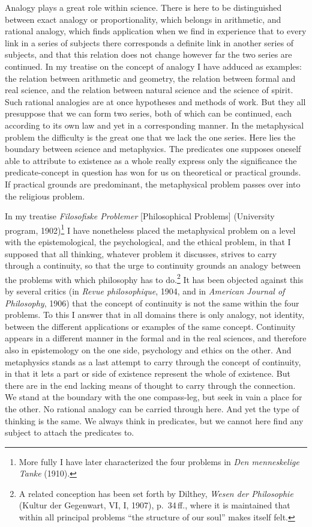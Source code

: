 \documentclass[12pt]{book}
\newcommand{\opage}[1]{\marginnote{\footnotesize\textit{[#1]}}}
\begin{document}
Analogy plays a great role within science. There is here to be distinguished between exact analogy or
proportionality, which belongs in arithmetic, and rational analogy, which finds application when we find in
experience that to every link in a series of subjects there corresponds a definite link in another series
of subjects, and that this relation does not change however far the two series are continued. In my treatise
on the concept of analogy I have adduced as examples: the relation between arithmetic and geometry, the
relation between formal and real science, and \opage{84}the relation between natural science and the science of
spirit. Such rational analogies are at once hypotheses and methods of work. But they all presuppose that we
can form two series, both of which can be continued, each according to its own law and yet in a
corresponding manner. In the metaphysical problem the difficulty is the great one that we lack the one
series. Here lies the boundary between science and metaphysics. The predicates one supposes oneself able to
attribute to existence as a whole really express only the significance the predicate-concept in question has
won for us on theoretical or practical grounds. If practical grounds are predominant, the metaphysical
problem passes over into the religious problem.

In my treatise \textit{Filosofiske Problemer} [Philosophical Problems] (University program,
1902)\footnote{More fully I have later characterized the four problems in \textit{Den menneskelige Tanke}
(1910).} I have nonetheless placed the metaphysical problem on a level with the epistemological, the
psychological, and the ethical problem, in that I supposed that all thinking, whatever problem it discusses,
strives to carry through a continuity, so that the urge to continuity grounds an analogy between the
problems with which philosophy has to do.\footnote{A related conception has been set forth by Dilthey,
\textit{Wesen der Philosophie} (Kultur der Gegenwart, VI, I, 1907), p.\ 34\,ff., where it is maintained
that within all principal problems ``the structure of our soul'' makes itself felt.} It has been objected
against this by several critics (in \textit{Revue philosophique}, 1904, and in \textit{American Journal of
Philosophy}, 1906) that the concept of continuity is not the same within the four problems. To this I answer
that in all domains there is only analogy, not identity, between the different applications or examples of
the same concept. Continuity appears in a different manner in the formal and in the real sciences, and
therefore also in \opage{85}epistemology on the one side, psychology and ethics on the other. And metaphysics stands
as a last attempt to carry through the concept of continuity, in that it lets a part or side of existence
represent the whole of existence. But there are in the end lacking means of thought to carry through the
connection. We stand at the boundary with the one compass-leg, but seek in vain a place for the other. No
rational analogy can be carried through here. And yet the type of thinking is the same. We always think in
predicates, but we cannot here find any subject to attach the predicates to.
\end{document}
